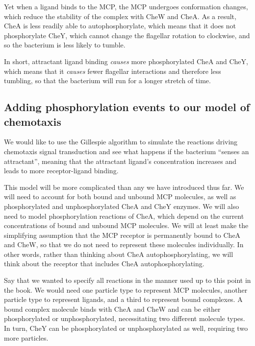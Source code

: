 Yet when a ligand binds to the MCP, the MCP undergoes conformation changes, which reduce the stability of the complex with CheW and CheA. As a result, CheA is less readily able to autophosphorylate, which means that it does not phosphorylate CheY, which cannot change the flagellar rotation to clockwise, and so the bacterium is less likely to tumble.

In short, attractant ligand binding \textit{causes} more phosphorylated CheA and CheY, which means that it \textit{causes} fewer flagellar interactions and therefore less tumbling, so that the bacterium will run for a longer stretch of time.\\

\begin{note}\end{note}


\FloatBarrier
{}
\subsection{Adding phosphorylation events to our model of chemotaxis}

We would like to use the Gillespie algorithm to simulate the reactions driving chemotaxis signal transduction and see what happens if the bacterium ``senses an attractant'', meaning that the attractant ligand's concentration increases and leads to more receptor-ligand binding.

This model will be more complicated than any we have introduced thus far. We will need to account for both bound and unbound MCP molecules, as well as phosphorylated and unphosphorylated CheA and CheY enzymes. We will also need to model phosphorylation reactions of CheA, which depend on the current concentrations of bound and unbound MCP molecules. We will at least make the simplifying assumption that the MCP receptor is permanently bound to CheA and CheW, so that we do not need to represent these molecules individually. In other words, rather than thinking about CheA autophosphorylating, we will think about the receptor that includes CheA autophosphorylating.

Say that we wanted to specify all reactions in the manner used up to this point in the book. We would need one particle type to represent MCP molecules, another particle type to represent ligands, and a third to represent bound complexes. A bound complex molecule binds with CheA and CheW and can be either phosphorylated or unphosphorylated, necessitating two different molecule types. In turn, CheY can be phosphorylated or unphosphorylated as well, requiring two more particles.

